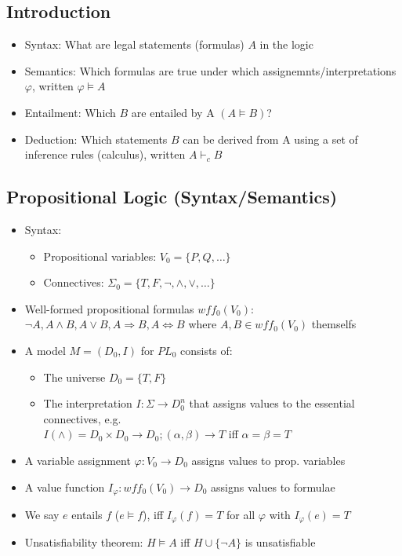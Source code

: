 \documentclass{scrartcl}
\begin{document}
\subsection{Introduction}
\begin{itemize}
    \item
        Syntax: What are legal statements (formulas) $A$ in the logic
    \item
        Semantics: Which formulas are true under which assignemnts/interpretations $\varphi$, written $\varphi \vDash A$
    \item
        Entailment: Which $B$ are entailed by A $(A \vDash B)$?
    \item
        Deduction: Which statements $B$ can be derived from A using a set of inference rules (calculus), written $A \vdash_c B$
\end{itemize}
\subsection{Propositional Logic (Syntax/Semantics)}
\begin{itemize}
    \item
        Syntax:
        \begin{itemize}
            \item
                Propositional variables: $V_0 = \{P, Q, \dots\}$ 
            \item
                Connectives: $\Sigma_0 = \{T, F, \lnot, \land, \lor, \dots\}$
        \end{itemize}
    \item
        Well-formed propositional formulas $wff_0(V_0)$: $\lnot A, A\land B, A \lor B, A \Rightarrow B, A \Leftrightarrow B$ where $A,B \in wff_0(V_0)$ themselfs
    \item
        A model $M = (D_0, I)$ for $PL_0$ consists of:
        \begin{itemize}
            \item
                The universe $D_0 = \{T, F\}$
            \item
                The interpretation $I: \Sigma \rightarrow D_0^n$ that assigns values to the essential connectives, e.g.\\
                $I(\land) = D_0 \times D_0 \rightarrow D_0; (\alpha, \beta) \rightarrow T$ iff $\alpha = \beta = T$
        \end{itemize}
    \item
        A variable assignment $\varphi: V_0 \rightarrow D_0$ assigns values to prop. variables
    \item
        A value function $I_{\varphi}: wff_0(V_0) \rightarrow D_0$ assigns values to formulae
    \item
        We say $e$ entails $f$ ($e \vDash f$), iff $I_{\varphi}(f) = T$ for all $\varphi$ with $I_{\varphi}(e) = T$
    \item
        Unsatisfiability theorem: $H \vDash A$ iff $H \cup \{\lnot A\}$ is unsatisfiable
\end{itemize}
\end{document}
